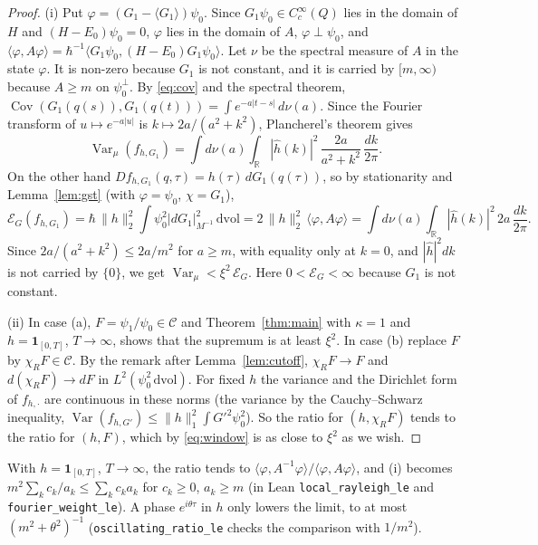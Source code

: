 \documentclass[11pt,a4paper]{article}
\theoremstyle{definition}
\theoremstyle{remark}
\newcommand{\R}{\mathbb{R}}
\newcommand{\Var}{\operatorname{Var}}
\newcommand{\Cov}{\operatorname{Cov}}
\newcommand{\cE}{\mathcal{E}}
\newcommand{\dvol}{\,\mathrm{dvol}}
\newcommand{\code}[1]{\texttt{#1}}
\begin{document}
\begin{proof}
(i) Put $\varphi=(G_1-\langle G_1\rangle)\psi_0$. Since $G_1\psi_0\in C_c^\infty(Q)$ lies in the domain of $H$ and $(H-E_0)\psi_0=0$, $\varphi$ lies in the domain of $A$, $\varphi\perp\psi_0$, and $\langle\varphi,A\varphi\rangle=\hbar^{-1}\langle G_1\psi_0,(H-E_0)G_1\psi_0\rangle$.
Let $\nu$ be the spectral measure of $A$ in the state $\varphi$.
It is non-zero because $G_1$ is not constant, and it is carried by $[m,\infty)$ because $A\ge m$ on $\psi_0^\perp$.
By \eqref{eq:cov} and the spectral theorem, $\Cov(G_1(q(s)),G_1(q(t)))=\int e^{-a|t-s|}\,d\nu(a)$.
Since the Fourier transform of $u\mapsto e^{-a|u|}$ is $k\mapsto2a/(a^2+k^2)$, Plancherel's theorem gives
\[
  \Var_\mu(f_{h,G_1})=\int d\nu(a)\int_\R|\hat h(k)|^2\,\frac{2a}{a^2+k^2}\,\frac{dk}{2\pi}.
\]
On the other hand $Df_{h,G_1}(q,\tau)=h(\tau)\,dG_1(q(\tau))$, so by stationarity and Lemma~\ref{lem:gst} (with $\varphi=\psi_0$, $\chi=G_1$),
\[
  \cE_G(f_{h,G_1})=\hbar\,\|h\|_2^2\int\psi_0^2|dG_1|^2_{M^{-1}}\dvol=2\,\|h\|_2^2\,\langle\varphi,A\varphi\rangle=\int d\nu(a)\int_\R|\hat h(k)|^2\,2a\,\frac{dk}{2\pi}.
\]
Since $2a/(a^2+k^2)\le 2a/m^2$ for $a\ge m$, with equality only at $k=0$, and $|\hat h|^2dk$ is not carried by $\{0\}$, we get $\Var_\mu<\xi^2\,\cE_G$.
Here $0<\cE_G<\infty$ because $G_1$ is not constant.

(ii) In case (a), $F=\psi_1/\psi_0\in\mathcal C$ and Theorem~\ref{thm:main} with $\kappa=1$ and $h=\mathbf 1_{[0,T]}$, $T\to\infty$, shows that the supremum is at least $\xi^2$.
In case (b) replace $F$ by $\chi_RF\in\mathcal C$.
By the remark after Lemma~\ref{lem:cutoff}, $\chi_RF\to F$ and $d(\chi_RF)\to dF$ in $L^2(\psi_0^2\dvol)$.
For fixed $h$ the variance and the Dirichlet form of $f_{h,\cdot}$ are continuous in these norms (the variance by the Cauchy--Schwarz inequality, $\Var(f_{h,G'})\le\|h\|_1^2\int G'^2\psi_0^2$). So the ratio for $(h,\chi_RF)$ tends to the ratio for $(h,F)$, which by \eqref{eq:window} is as close to $\xi^2$ as we wish.
\end{proof}

With $h=\mathbf 1_{[0,T]}$, $T\to\infty$, the ratio tends to $\langle\varphi,A^{-1}\varphi\rangle/\langle\varphi,A\varphi\rangle$, and (i) becomes $m^2\sum_kc_k/a_k\le\sum_kc_ka_k$ for $c_k\ge0$, $a_k\ge m$ (in Lean \code{local\_\allowbreak{}rayleigh\_le} and \code{fourier\_\allowbreak{}weight\_le}).
A phase $e^{i\theta\tau}$ in $h$ only lowers the limit, to at most $(m^2+\theta^2)^{-1}$ (\code{oscillating\_\allowbreak{}ratio\_le} checks the comparison with $1/m^2$).
\end{document}
